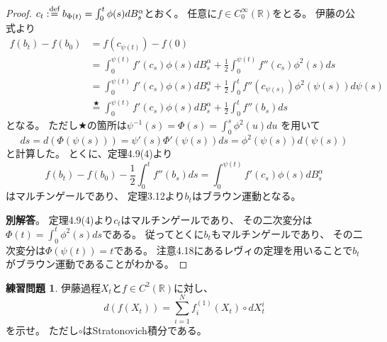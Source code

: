 \documentclass[uplatex]{jsarticle}
\theoremstyle{definition}
\newtheorem{prob}[prob]{練習問題}
\def\R{\mathbb{R}}
\def\dfn{:\overset{\mbox{{\scriptsize def}}}{=}}
\begin{document}
\begin{proof}
  \(c_t \dfn b_{\Phi(t)} = \int_0^t\phi(s)dB_s^\alpha\)とおく。
  任意に\(f\in C_0^\infty(\R)\)をとる。
  伊藤の公式より
  \begin{align*}
    f(b_t) - f(b_0)
    &= f(c_{\psi(t)}) - f(0) \\
    &= \int_0^{\psi(t)} f'(c_s)\phi(s)dB_s^\alpha
    + \frac{1}{2}\int_0^{\psi(t)} f''(c_s)\phi^2(s) ds \\
    &= \int_0^{\psi(t)} f'(c_s)\phi(s)dB_s^\alpha
    + \frac{1}{2}\int_0^t f''(c_{\psi(s)})\phi^2(\psi(s)) d\psi(s) \\
    &\overset{\bigstar}{=} \int_0^{\psi(t)} f'(c_s)\phi(s)dB_s^\alpha
    + \frac{1}{2}\int_0^t f''(b_s) ds
  \end{align*}
  となる。
  ただし\(\bigstar\)の箇所は\(\psi^{-1}(s) = \Phi(s) = \int_0^s\phi^2(u)du\)
  を用いて
  \[
  ds = d\left( \Phi(\psi(s)) \right)
  = \psi'(s)\Phi'(\psi(s)) ds = \phi^2(\psi(s))d(\psi(s))
  \]
  と計算した。
  とくに、定理4.9(4)より
  \[
  f(b_t) - f(b_0) - \frac{1}{2}\int_0^tf''(b_s)ds
  = \int_0^{\psi(t)} f'(c_s)\phi(s)dB_s^\alpha
  \]
  はマルチンゲールであり、
  定理3.12より\(b_t\)はブラウン運動となる。

  \textbf{別解答}。
  定理4.9(4)より\(c_t\)はマルチンゲールであり、
  その二次変分は\(\Phi(t) = \int_0^t\phi^2(s)ds\)である。
  従ってとくに\(b_t\)もマルチンゲールであり、
  その二次変分は\(\Phi(\psi(t)) = t\)である。
  注意4.18にあるレヴィの定理を用いることで\(b_t\)がブラウン運動であることがわかる。
\end{proof}





\begin{prob}\label{prob: 4.5}
  伊藤過程\(X_t\)と\(f\in C^2(\R)\)に対し、
  \[
  d(f(X_t)) = \sum_{i=1}^Nf_i^{(1)}(X_t)\circ dX_t^i
  \]
  を示せ。
  ただし\(\circ\)はStratonovich積分である。
\end{prob}
\end{document}
